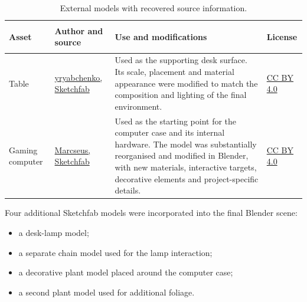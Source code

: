 \documentclass{report}
\begin{document}
\begin{table}[ht]
    \centering
    \footnotesize
    \setlength{\tabcolsep}{5pt}
    \renewcommand{\arraystretch}{1.25}

    \begin{tabularx}{\textwidth}{
        @{}
        >{\bfseries\raggedright\arraybackslash}p{}
        >{\raggedright\arraybackslash}p{}
        >{\raggedright\arraybackslash}X
        >{\centering\arraybackslash}p{}
        @{}
    }
        \toprule
        Asset & Author and source & Use and modifications & License \\
        \midrule

        Table
        &
        \href{
        https://sketchfab.com/3d-models/table-1132fa2850a24917892733566bd68e74
        }{yryabchenko, Sketchfab}
        &
        Used as the supporting desk surface. Its scale, placement and
        material appearance were modified to match the composition and
        lighting of the final environment.
        &
        \href{
        https://creativecommons.org/licenses/by/4.0/
        }{CC BY 4.0}
        \\

        Gaming computer
        &
        \href{
        https://sketchfab.com/3d-models/gaming-computer-7cf383ddfe9047f89435b4fc2a6e1053
        }{Marcseus, Sketchfab}
        &
        Used as the starting point for the computer case and its
        internal hardware. The model was substantially reorganised and
        modified in Blender, with new materials, interactive targets,
        decorative elements and project-specific details.
        &
        \href{
        https://creativecommons.org/licenses/by/4.0/
        }{CC BY 4.0}
        \\

        \bottomrule
    \end{tabularx}

    \caption{External models with recovered source information.}
    \label{tab:identified-external-models}
\end{table}

Four additional Sketchfab models were incorporated into the final
Blender scene:

\begin{itemize}
    \item a desk-lamp model;
    \item a separate chain model used for the lamp interaction;
    \item a decorative plant model placed around the computer case;
    \item a second plant model used for additional foliage.
\end{itemize}
\end{document}
